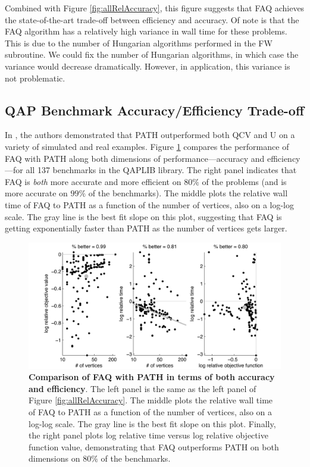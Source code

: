 \documentclass[10pt]{article}
\begin{document}
Combined with Figure \ref{fig:allRelAccuracy}, this figure suggests that FAQ achieves the state-of-the-art trade-off between efficiency and accuracy.  
Of note is that the FAQ algorithm has a relatively high variance in wall time for these problems.  This is due to the number of Hungarian algorithms performed in the FW subroutine.  We could fix the number of Hungarian algorithms, in which case the variance would decrease dramatically.  However, in application, this variance is not problematic.


\subsection{QAP Benchmark Accuracy/Efficiency Trade-off} 
\label{sub:tradeoff}


In \cite{Zaslavskiy2009}, the authors demonstrated that PATH outperformed both QCV and U on a variety of simulated and real examples.  Figure \ref{fig:tradeoff} compares the performance of FAQ with PATH along both dimensions of performance---accuracy and efficiency---for all 137 benchmarks in the QAPLIB library.  The right panel indicates that FAQ is {\it both} more accurate and more efficient on $80\%$ of the problems (and is more accurate on $99\%$ of the benchmarks).  The middle plots the relative wall time of FAQ to PATH as a function of the number of vertices, also on a log-log scale.  The gray line is the best fit slope on this plot, suggesting that FAQ is getting exponentially faster than PATH as the number of vertices gets larger.

\begin{figure}[h!]
	\centering
		\includegraphics[width=1.0\linewidth]{Figure4.pdf}
	\caption{{\bf Comparison of FAQ with PATH in terms of both accuracy and efficiency}.  The left panel is the same as the left panel of Figure \ref{fig:allRelAccuracy}.  The middle plots the relative wall time of FAQ to PATH as a function of the number of vertices, also on a log-log scale.  The gray line is the best fit slope on this plot.  Finally, the right panel plots log relative time versus log relative objective function value, demonstrating that FAQ outperforms PATH on both dimensions on $80\%$ of the benchmarks.}
	\label{fig:tradeoff}
\end{figure}
\end{document}
